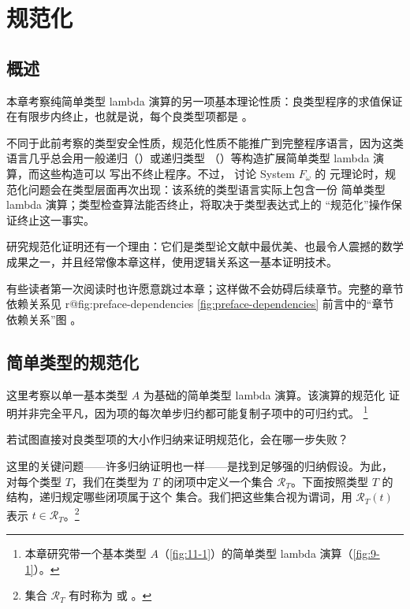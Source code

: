 
\chapter{规范化}
\label{chap:12}

\section*{概述}

本章考察纯简单类型 lambda 演算的另一项基本理论性质：良类型程序的求值保证
在有限步内终止，也就是说，每个良类型项都是
。

不同于此前考察的类型安全性质，规范化性质不能推广到完整程序语言，因为这类
语言几乎总会用一般递归（）或递归类型
（）等构造扩展简单类型 lambda 演算，而这些构造可以
写出不终止程序。不过， 讨论
System \(F_\omega\) 的
元理论时，规范化问题会在类型层面再次出现：该系统的类型语言实际上包含一份
简单类型 lambda 演算；类型检查算法能否终止，将取决于类型表达式上的
“规范化”操作保证终止这一事实。

研究规范化证明还有一个理由：它们是类型论文献中最优美、也最令人震撼的数学
成果之一，并且经常像本章这样，使用逻辑关系这一基本证明技术。

有些读者第一次阅读时也许愿意跳过本章；这样做不会妨碍后续章节。完整的章节
依赖关系见%
\ifcsname r@fig:preface-dependencies\endcsname
  \cref{fig:preface-dependencies}%
\else
  前言中的“章节依赖关系”图%
\fi
。

\section{简单类型的规范化}
\label{sec:12.1}

这里考察以单一基本类型 \(A\) 为基础的简单类型 lambda 演算。该演算的规范化
证明并非完全平凡，因为项的每次单步归约都可能复制子项中的可归约式。
\footnote{本章研究带一个基本类型 \(A\)（\cref{fig:11-1}）的简单类型
lambda 演算（\cref{fig:9-1}）。}

\begin{exercise}[\(\star\)]
\label{ex:12.1.1}
若试图直接对良类型项的大小作归纳来证明规范化，会在哪一步失败？
\end{exercise}

这里的关键问题——许多归纳证明也一样——是找到足够强的归纳假设。为此，
对每个类型 \(T\)，我们在类型为 \(T\) 的闭项中定义一个集合
\(\mathcal R_T\)。下面按照类型 \(T\) 的结构，递归规定哪些闭项属于这个
集合。我们把这些集合视为谓词，用 \(\mathcal R_T(t)\) 表示
\(t\in\mathcal R_T\)。\footnote{集合 \(\mathcal R_T\) 有时称为
或
。}

